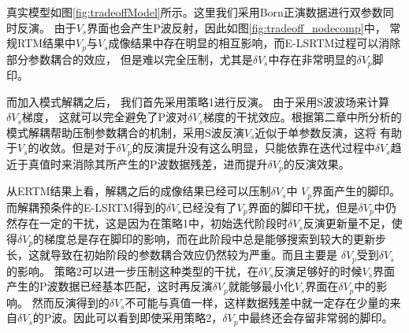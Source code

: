 真实模型如图\ref{fig:tradeoffModel}所示。这里我们采用Born正演数据进行双参数同时反演。
由于$V_s$界面也会产生P波反射，因此如图\ref{fig:tradeoff_nodecomp}中，
常规RTM结果中$V_p$与$V_s$成像结果中存在明显的相互影响，而E-LSRTM过程可以消除部分参数耦合的效应，
但是难以完全压制，尤其是$\delta V_s$中存在非常明显的$\delta V_p$脚印。

而加入模式解耦之后，
我们首先采用策略1进行反演。
由于采用S波波场来计算$\delta V_s$梯度，
这就可以完全避免了P波对$\delta
V_s$梯度的干扰效应。根据第二章中所分析的模式解耦帮助压制参数耦合的机制，采用S波反演$V_s$近似于单参数反演，这将
有助于$V_s$的收敛。但是对于$\delta
V_p$的反演提升没有这么明显，只能依靠在迭代过程中$\delta
V_s$趋近于真值时来消除其所产生的P波数据残差，进而提升$\delta V_p$的反演效果。

从ERTM结果上看，解耦之后的成像结果已经可以压制$\delta V_s$中
$V_p$界面产生的脚印。而解耦预条件的E-LSRTM得到的$\delta
V_s$已经没有了$V_p$界面的脚印干扰，但是$\delta
V_p$中仍然存在一定的干扰，这是因为在策略1中，初始迭代阶段时$\delta
V_s$反演更新量不足，使得$\delta
V_p$的梯度总是存在脚印的影响，而在此阶段中总是能够搜索到较大的更新步长，这就导致在初始阶段的参数耦合效应仍然较为严重。而且主要是
$\delta V_p$受到$\delta V_s$的影响。
策略2可以进一步压制这种类型的干扰，在$\delta
V_s$反演足够好的时候$V_s$界面产生的P波数据已经基本匹配，这时再反演$\delta
V_p$就能够最小化$V_s$界面在$\delta V_p$中的影响。
然而反演得到的$\delta V_s$不可能与真值一样，这样数据残差中就一定存在少量的来自$\delta
V_s$的P波。因此可以看到即使采用策略2，$\delta V_p$中最终还会存留非常弱的脚印。


